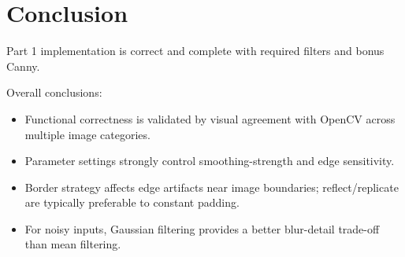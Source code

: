 \documentclass[11pt,a4paper]{article}
\begin{document}
\section{Conclusion}
Part 1 implementation is correct and complete with required filters and bonus Canny.

Overall conclusions:
\begin{itemize}
    \item Functional correctness is validated by visual agreement with OpenCV across multiple image categories.
    \item Parameter settings strongly control smoothing-strength and edge sensitivity.
    \item Border strategy affects edge artifacts near image boundaries; reflect/replicate are typically preferable to constant padding.
    \item For noisy inputs, Gaussian filtering provides a better blur-detail trade-off than mean filtering.
\end{itemize}
\end{document}
